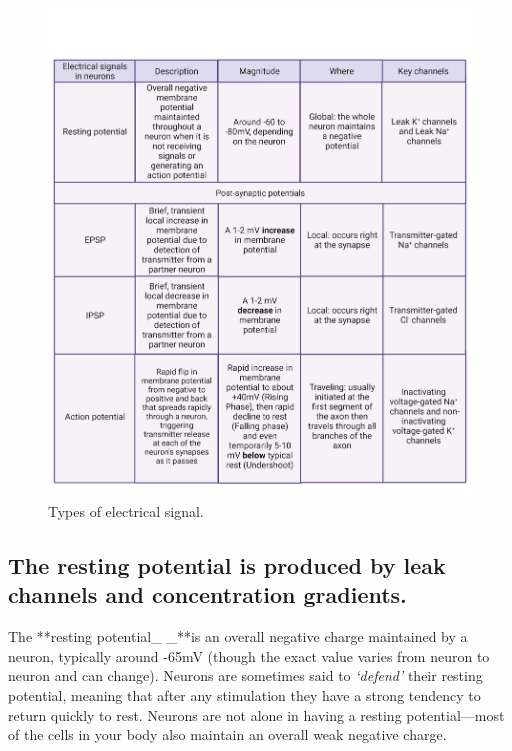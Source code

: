 \documentclass[
]{book}
\begin{document}
\begin{figure}

{\centering \includegraphics[width=0.9\linewidth]{images/ch02/table_02_03} 

}

\caption{Types of electrical signal.}\label{fig:electrical-signals-table}
\end{figure}

\hypertarget{the-resting-potential-is-produced-by-leak-channels-and-concentration-gradients.}{%
\subsection{The resting potential is produced by leak channels and concentration gradients.}\label{the-resting-potential-is-produced-by-leak-channels-and-concentration-gradients.}}

The **resting potential\_ \_**is an overall negative charge maintained by a neuron, typically around -65mV (though the exact value varies from neuron to neuron and can change). Neurons are sometimes said to \emph{`defend'} their resting potential, meaning that after any stimulation they have a strong tendency to return quickly to rest. Neurons are not alone in having a resting potential---most of the cells in your body also maintain an overall weak negative charge.
\end{document}
